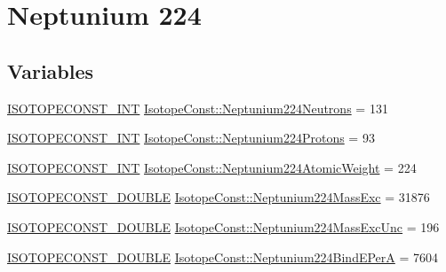 \hypertarget{group___isotope_const-_neptunium-_np224}{}\section{Neptunium 224}
\label{group___isotope_const-_neptunium-_np224}
\subsection*{Variables}
\begin{DoxyCompactItemize}
\item 
\mbox{\hyperlink{group___isotope_const-_macros_ga5f18360b3e99483a35c32d789e62621c}{I\+S\+O\+T\+O\+P\+E\+C\+O\+N\+S\+T\+\_\+\+I\+NT}} \mbox{\hyperlink{group___isotope_const-_neptunium-_np224_ga792f26feadff78496d7cb641c56fb483}{Isotope\+Const\+::\+Neptunium224\+Neutrons}} = 131
\item 
\mbox{\hyperlink{group___isotope_const-_macros_ga5f18360b3e99483a35c32d789e62621c}{I\+S\+O\+T\+O\+P\+E\+C\+O\+N\+S\+T\+\_\+\+I\+NT}} \mbox{\hyperlink{group___isotope_const-_neptunium-_np224_gab781327f2b131e281366277dc206ba89}{Isotope\+Const\+::\+Neptunium224\+Protons}} = 93
\item 
\mbox{\hyperlink{group___isotope_const-_macros_ga5f18360b3e99483a35c32d789e62621c}{I\+S\+O\+T\+O\+P\+E\+C\+O\+N\+S\+T\+\_\+\+I\+NT}} \mbox{\hyperlink{group___isotope_const-_neptunium-_np224_ga347c1096b8cc03403a742f358f6c54d0}{Isotope\+Const\+::\+Neptunium224\+Atomic\+Weight}} = 224
\item 
\mbox{\hyperlink{group___isotope_const-_macros_ga8f45a7272ce02c0b4c65c44636ed719a}{I\+S\+O\+T\+O\+P\+E\+C\+O\+N\+S\+T\+\_\+\+D\+O\+U\+B\+LE}} \mbox{\hyperlink{group___isotope_const-_neptunium-_np224_gadfe49e6f7a22d33216f84a0d5ff3ea3c}{Isotope\+Const\+::\+Neptunium224\+Mass\+Exc}} = 31876
\item 
\mbox{\hyperlink{group___isotope_const-_macros_ga8f45a7272ce02c0b4c65c44636ed719a}{I\+S\+O\+T\+O\+P\+E\+C\+O\+N\+S\+T\+\_\+\+D\+O\+U\+B\+LE}} \mbox{\hyperlink{group___isotope_const-_neptunium-_np224_ga05eddd5f587925b4b1fe70cb69f63556}{Isotope\+Const\+::\+Neptunium224\+Mass\+Exc\+Unc}} = 196
\item 
\mbox{\hyperlink{group___isotope_const-_macros_ga8f45a7272ce02c0b4c65c44636ed719a}{I\+S\+O\+T\+O\+P\+E\+C\+O\+N\+S\+T\+\_\+\+D\+O\+U\+B\+LE}} \mbox{\hyperlink{group___isotope_const-_neptunium-_np224_gaf36f54b5a3a61270906556d570e6c000}{Isotope\+Const\+::\+Neptunium224\+Bind\+E\+PerA}} = 7604
\item 

\end{DoxyCompactItemize}
